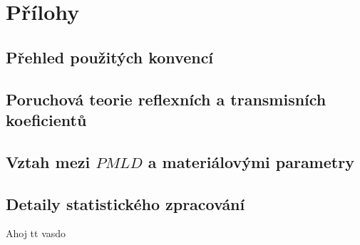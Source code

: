 \documentclass[singleside]{thesis}
\begin{document}

\tableofcontents





\appendix
  \chapter{Přílohy}
  \section{Přehled použitých konvencí}\label{k:dodatek konvence}
  \section{Poruchová teorie reflexních a transmisních koeficientů}\label{k:dodatek vypocet}
  \section{Vztah mezi $PMLD$ a materiálovými parametry}
  \section{Detaily statistického zpracování}
Ahoj tt vasdo

\openright
\end{document}
